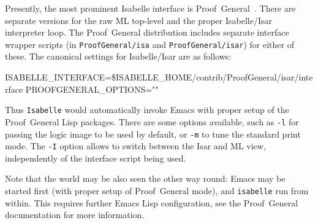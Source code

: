 Presently, the most prominent Isabelle interface is
Proof~General~\cite{proofgeneral}.  There
are separate versions for the raw ML top-level and the proper Isabelle/Isar
interpreter loop.  The Proof~General distribution includes separate interface
wrapper scripts (in \texttt{ProofGeneral/isa} and \texttt{ProofGeneral/isar})
for either of these.  The canonical settings for Isabelle/Isar are as follows:
\begin{ttbox}
ISABELLE_INTERFACE=\$ISABELLE_HOME/contrib/ProofGeneral/isar/interface
PROOFGENERAL_OPTIONS=""
\end{ttbox}
Thus \texttt{Isabelle} would automatically invoke Emacs with proper setup of
the Proof~General Lisp packages.  There are some options available, such as
\texttt{-l} for passing the logic image to be used by default, or \texttt{-m}
to tune the standard print mode.  The \texttt{-I} option allows to switch
between the Isar and ML view, independently of the interface script being
used.
  
\medskip Note that the world may be also seen the other way round: Emacs may
be started first (with proper setup of Proof~General mode), and
\texttt{isabelle} run from within.  This requires further Emacs Lisp
configuration, see the Proof~General documentation \cite{proofgeneral} for
more information.

